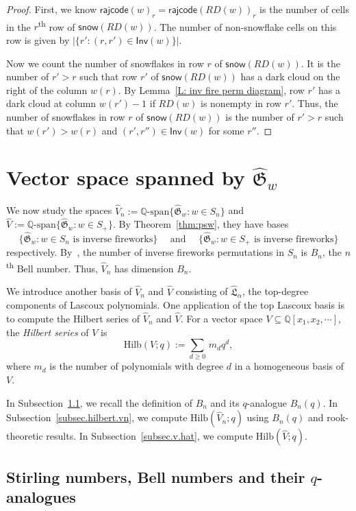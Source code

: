 \documentclass[10pt]{amsart}
\theoremstyle{plain}
\theoremstyle{plain}
\theoremstyle{definition}
\theoremstyle{definition}
\theoremstyle{definition}
\theoremstyle{plain}
\theoremstyle{plain}
\theoremstyle{plain}
\theoremstyle{plain}
\theoremstyle{plain}
\theoremstyle{remark}
\theoremstyle{remark}
\theoremstyle{plain}
\theoremstyle{plain}
\newcommand{\fG}{\mathfrak{G}}
\newcommand{\fL}{\mathfrak{L}}
\newcommand{\topLas}{\widehat{\fL}}
\newcommand{\topGro}{\widehat{\fG}}
\newcommand{\Q}{\mathbb{Q}}
\newcommand{\snow}{\mathsf{snow}}
\newcommand{\rajcode}{\mathsf{rajcode}}
\newcommand{\Inv}{\mathsf{Inv}}
\newcommand{\definition}[1]{{\color{darkred}\emph{#1}}}
\newcommand{\Hilb}{\mathrm{Hilb}}
\begin{document}
\begin{proof}
First, we know $\rajcode(w)_r = \rajcode(RD(w))_r$
is the number of cells in the $r$\textsuperscript{th}  row of $\snow(RD(w))$.
The number of non-snowflake cells
on this row is given by $|\{r': (r, r') \in \Inv(w)\}|$.

Now we count the number of snowflakes 
in row $r$ of $\snow(RD(w))$.
It is the number of $r' > r$
such that row $r'$ of $\snow(RD(w))$ has a dark cloud
on the right of the column $w(r)$.
By Lemma~\ref{L: inv fire perm diagram}, 
row $r'$ has a dark cloud 
at column $w(r') - 1$ if $RD(w)$ is nonempty in row $r'$.
Thus, the number of snowflakes 
in row $r$ of $\snow(RD(w))$ is the number of $r' > r$
such that $w(r') > w(r)$ and $(r', r'') \in \Inv(w)$
for some $r''$.
\end{proof}


\section{Vector space spanned by \texorpdfstring{$\topGro_w$}{TEXT}}\label{S: Space}

We now study the spaces
$\widehat{V}_n := \Q\textrm{-span}\{\topGro_w: w \in S_n\}$
and $\widehat{V} := \Q\textrm{-span}\{\topGro_w: w \in S_+\}$.
By Theorem~\ref{thm:psw},
they have bases
$$\{\topGro_w: w \in S_n 
\textrm{ is inverse fireworks}\}  
\quad\textrm{ and }\quad 
\{\topGro_w: w \in S_+ \textrm{ is inverse fireworks}\}
$$
respectively. 
By~\cite{Cla}, 
the number of inverse fireworks permutations in $S_n$
is $B_n$, the $n$\textsuperscript{th} Bell number.
Thus, $\widehat{V}_n$ has dimension $B_n$.

We introduce another basis of $\widehat{V}_n$ and $\widehat{V}$ 
consisting of $\topLas_\alpha$, the top-degree components of Lascoux polynomials.
One application of 
the top Lascoux basis 
is to compute the Hilbert series of $\widehat{V}_n$
and $\widehat{V}$.
For a vector space $V \subseteq \Q[x_1, x_2, \cdots]$,
the \definition{Hilbert series} of $V$ is 
$$\Hilb(V;q) := \sum_{d \geq 0}\, m_d q^d,$$
where $m_d$ is the number of polynomials 
with degree $d$ in a homogeneous 
basis of $V$.


In Subsection~\ref{SS: Bell},
we recall the definition of $B_n$ and its $q$-analogue $B_n(q)$. 
In Subsection~\ref{subsec.hilbert.vn}, we compute $\Hilb(\widehat{V}_n;q)$ 
using $B_n(q)$ and rook-theoretic results. 
In Subsection~\ref{subsec.v.hat},
we compute $\Hilb(\widehat{V};q)$.


\subsection{Stirling numbers, Bell numbers
and their \texorpdfstring{$q$}{TEXT}-analogues}
\label{SS: Bell}
\end{document}
